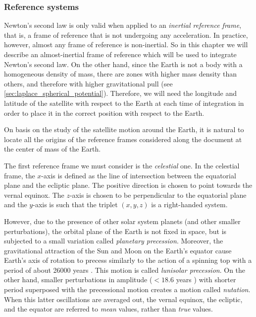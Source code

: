 \documentclass[../main.tex]{subfiles}
\begin{document}
\subsubsection{Reference systems}\label{sec:reference_systems}
Newton's second law is only valid when applied to an \emph{inertial reference frame}, that is, a frame of reference that is not undergoing any acceleration. In practice, however, almost any frame of reference is non-inertial. So in this chapter we will describe an almost-inertial frame of reference which will be used to integrate Newton's second law. On the other hand, since the Earth is not a body with a homogeneous density of mass, there are zones with higher mass density than others, and therefore with higher gravitational pull (see \cref{sec:laplace_spherical_potential}). Therefore, we will need the longitude and latitude of the satellite with respect to the Earth at each time of integration in order to place it in the correct position with respect to the Earth.

On basis on the study of the satellite motion around the Earth, it is natural to locate all the origins of the reference frames considered along the document at the center of mass of the Earth.

The first reference frame we must consider is the \emph{celestial} one. In the celestial frame, the $x$-axis is defined as the line of intersection between the equatorial plane and the ecliptic plane. The positive direction is chosen to point towards the vernal equinox. The $z$-axis is chosen to be perpendicular to the equatorial plane and the $y$-axis is such that the triplet $(x,y,z)$ is a right-handed system.

However, due to the presence of other solar system planets (and other smaller perturbations), the orbital plane of the Earth is not fixed in space, but is subjected to a small variation called \emph{planetary precession}. Moreover, the gravitational attraction of the Sun and Moon on the Earth's equator cause Earth's axis of rotation to precess similarly to the action of a spinning top with a period of about 26000 years \cite{montenbruck}. This motion is called \emph{lunisolar precession}. On the other hand, smaller perturbations in amplitude ($<18.6$ years \cite{wiki:eci}) with shorter period superposed with the precessional motion creates a motion called \emph{nutation}. When this latter oscillations are averaged out, the vernal equinox, the ecliptic, and the equator are referred to \emph{mean} values, rather than \emph{true} values.
\end{document}
